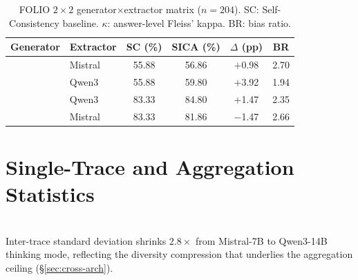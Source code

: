 \begin{table}[h]
\centering
\small
\caption{FOLIO $2{\times}2$ generator${\times}$extractor matrix ($n{=}204$). SC: Self-Consistency baseline. $\kappa$: answer-level Fleiss' kappa. BR: bias ratio.}
\label{tab:2x2-folio}
\setlength{\tabcolsep}{3pt}
\begin{tabular}{@{}llcccc@{}}
\toprule
Generator & Extractor & SC (\%) & SICA (\%) & $\Delta$ (pp) & BR \\
\midrule
{}
  & Mistral & 55.88 & 56.86 & $+$0.98 & 2.70 \\
  & Qwen3 & 55.88 & 59.80 & $+$3.92 & 1.94 \\
\addlinespace
{}
  & Qwen3 & 83.33 & 84.80 & $+$1.47 & 2.35 \\
  & Mistral & 83.33 & 81.86 & $-$1.47 & 2.66 \\
\bottomrule
\end{tabular}
\end{table}

\section{Single-Trace and Aggregation Statistics}
\label{app:single-trace}

\begin{table}[h]
\centering
\small
\caption{Single-trace accuracy (mean $\pm$ std over $K{=}12$ traces) and SC@12 majority vote on FOLIO ($n{=}204$). Aggregation gain = SC@12 $-$ single-trace mean. SC@12 uses alphabetical tiebreaking (consistent with Table~\ref{tab:main_results}).}
\label{tab:single-trace-stats}
\\[2pt]
{\footnotesize Inter-trace standard deviation shrinks $2.8\times$ from Mistral-7B to Qwen3-14B thinking mode, reflecting the diversity compression that underlies the aggregation ceiling (\S\ref{sec:cross-arch}).}
\end{table}

